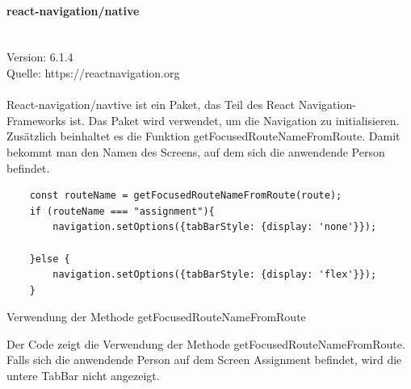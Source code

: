 \paragraph{react-navigation/native}\mbox{}\\
Version: 6.1.4\\
Quelle: https://reactnavigation.org\\ \\
React-navigation/navtive ist ein Paket, das Teil des React Navigation-\Gls{Framework}s ist. Das Paket wird verwendet, um die Navigation zu initialisieren. Zusätzlich beinhaltet es die Funktion getFocusedRouteNameFromRoute. Damit bekommt man den Namen des Screens, auf dem sich die anwendende Person befindet.\\
\begin{listing}[H]
\begin{verbatim}
    const routeName = getFocusedRouteNameFromRoute(route);
    if (routeName === "assignment"){
        navigation.setOptions({tabBarStyle: {display: 'none'}});
        
    }else {
        navigation.setOptions({tabBarStyle: {display: 'flex'}});
    }
\end{verbatim}
\caption{Verwendung der Methode getFocusedRouteNameFromRoute}
  \label{lst:getfocusedroutename}
\end{listing}
Der Code zeigt die Verwendung der Methode getFocusedRouteNameFromRoute. Falls sich die anwendende Person auf dem Screen Assignment befindet, wird die untere TabBar nicht angezeigt.\\



